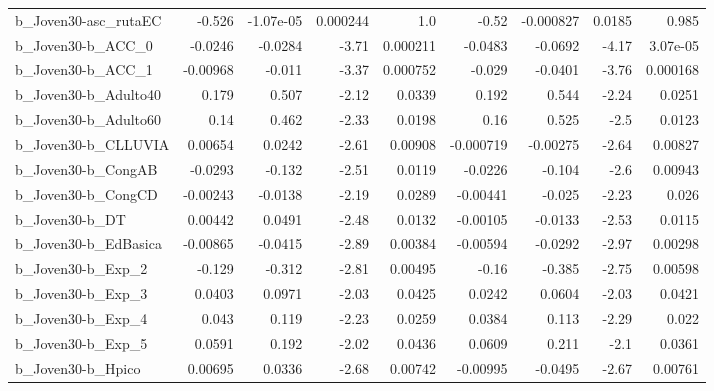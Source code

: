 \begin{tabular}{lrrrrrrrr}
b\_Joven30-asc\_rutaEC       &      -0.526 &    -1.07e-05 &  0.000244 &      1.0 &      -0.52 &   -0.000827 &       0.0185 &         0.985 \\
b\_Joven30-b\_ACC\_0          &     -0.0246 &      -0.0284 &     -3.71 & 0.000211 &    -0.0483 &     -0.0692 &        -4.17 &      3.07e-05 \\
b\_Joven30-b\_ACC\_1          &    -0.00968 &       -0.011 &     -3.37 & 0.000752 &     -0.029 &     -0.0401 &        -3.76 &      0.000168 \\
b\_Joven30-b\_Adulto40       &       0.179 &        0.507 &     -2.12 &   0.0339 &      0.192 &       0.544 &        -2.24 &        0.0251 \\
b\_Joven30-b\_Adulto60       &        0.14 &        0.462 &     -2.33 &   0.0198 &       0.16 &       0.525 &         -2.5 &        0.0123 \\
b\_Joven30-b\_CLLUVIA        &     0.00654 &       0.0242 &     -2.61 &  0.00908 &  -0.000719 &    -0.00275 &        -2.64 &       0.00827 \\
b\_Joven30-b\_CongAB         &     -0.0293 &       -0.132 &     -2.51 &   0.0119 &    -0.0226 &      -0.104 &         -2.6 &       0.00943 \\
b\_Joven30-b\_CongCD         &    -0.00243 &      -0.0138 &     -2.19 &   0.0289 &   -0.00441 &      -0.025 &        -2.23 &         0.026 \\
b\_Joven30-b\_DT             &     0.00442 &       0.0491 &     -2.48 &   0.0132 &   -0.00105 &     -0.0133 &        -2.53 &        0.0115 \\
b\_Joven30-b\_EdBasica       &    -0.00865 &      -0.0415 &     -2.89 &  0.00384 &   -0.00594 &     -0.0292 &        -2.97 &       0.00298 \\
b\_Joven30-b\_Exp\_2          &      -0.129 &       -0.312 &     -2.81 &  0.00495 &      -0.16 &      -0.385 &        -2.75 &       0.00598 \\
b\_Joven30-b\_Exp\_3          &      0.0403 &       0.0971 &     -2.03 &   0.0425 &     0.0242 &      0.0604 &        -2.03 &        0.0421 \\
b\_Joven30-b\_Exp\_4          &       0.043 &        0.119 &     -2.23 &   0.0259 &     0.0384 &       0.113 &        -2.29 &         0.022 \\
b\_Joven30-b\_Exp\_5          &      0.0591 &        0.192 &     -2.02 &   0.0436 &     0.0609 &       0.211 &         -2.1 &        0.0361 \\
b\_Joven30-b\_Hpico          &     0.00695 &       0.0336 &     -2.68 &  0.00742 &   -0.00995 &     -0.0495 &        -2.67 &       0.00761 \\

\end{tabular}
